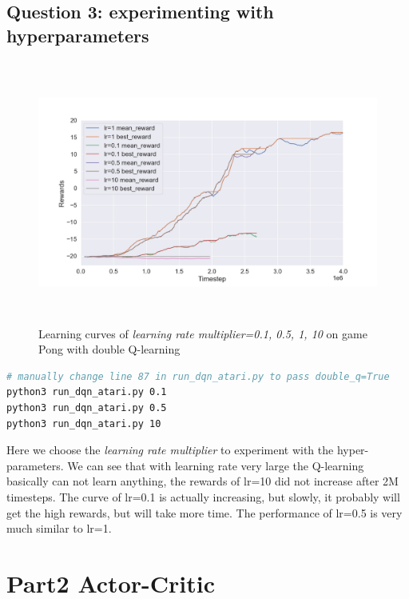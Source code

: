 \documentclass[12pt]{article}
\begin{document}
\subsection*{Question 3: experimenting with hyperparameters}
\begin{figure}[H]
  \centering
  \includegraphics[height=3.4in]{part1_q3.png}
  \caption{Learning curves of \textit{learning rate multiplier=0.1, 0.5, 1, 10} on game Pong with double Q-learning}
\end{figure}
\begin{lstlisting}[language=bash]
# manually change line 87 in run_dqn_atari.py to pass double_q=True
python3 run_dqn_atari.py 0.1 
python3 run_dqn_atari.py 0.5
python3 run_dqn_atari.py 10
\end{lstlisting}
Here we choose the \textit{learning rate multiplier} to experiment with the hyper-parameters.
We can see that with learning rate very large the Q-learning basically can not learn anything, the rewards of lr=10 did not increase after 2M timesteps. The curve of lr=0.1 is actually increasing, but slowly, it probably will get the high rewards, but will take more time. The performance of lr=0.5 is very much similar to lr=1.

\newpage
\section*{Part2 Actor-Critic}
\end{document}
